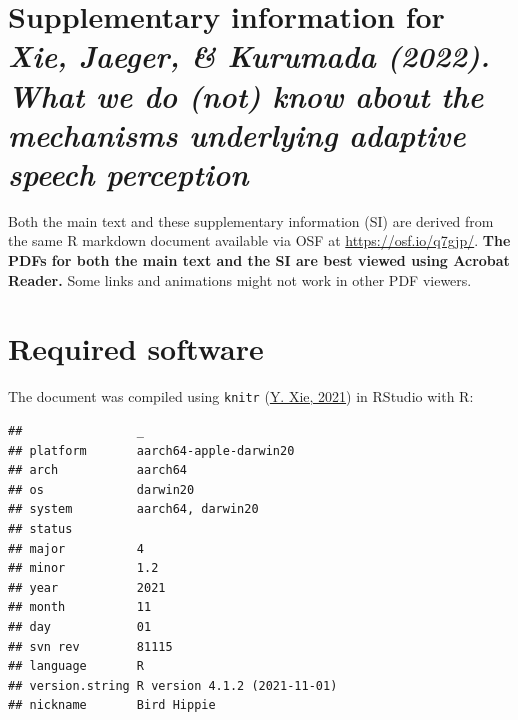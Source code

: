 \documentclass[
  11pt,
  english,
  man,floatsintext]{apa6}
\begin{document}
\newpage
\setcounter{page}{1}
\renewcommand{\thesection}{\S \arabic{section}}
\renewcommand{\theHsection}{sisection. \arabic{section}}

\hypertarget{supplementary-information-for-xie-jaeger-kurumada-2022.-what-we-do-not-know-about-the-mechanisms-underlying-adaptive-speech-perception}{%
\section*{\texorpdfstring{Supplementary information for \emph{Xie, Jaeger, \& Kurumada (2022). What we do (not) know about the mechanisms underlying adaptive speech perception}}{Supplementary information for Xie, Jaeger, \& Kurumada (2022). What we do (not) know about the mechanisms underlying adaptive speech perception}}\label{supplementary-information-for-xie-jaeger-kurumada-2022.-what-we-do-not-know-about-the-mechanisms-underlying-adaptive-speech-perception}}

Both the main text and these supplementary information (SI) are derived from the same R markdown document available via OSF at \url{https://osf.io/q7gjp/}. \textbf{The PDFs for both the main text and the SI are best viewed using Acrobat Reader.} Some links and animations might not work in other PDF viewers.

\setcounter{section}{0}

\hypertarget{sec:SI-software}{%
\section{Required software}\label{sec:SI-software}}

The document was compiled using \texttt{knitr} (\protect\hyperlink{ref-xie2021}{Y. Xie, 2021}) in RStudio with R:

\begin{verbatim}
##                _                           
## platform       aarch64-apple-darwin20      
## arch           aarch64                     
## os             darwin20                    
## system         aarch64, darwin20           
## status                                     
## major          4                           
## minor          1.2                         
## year           2021                        
## month          11                          
## day            01                          
## svn rev        81115                       
## language       R                           
## version.string R version 4.1.2 (2021-11-01)
## nickname       Bird Hippie
\end{verbatim}
\end{document}

